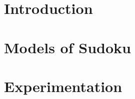 \documentclass[12pt,letterpaper]{article}
\title{\articletitle}
\author{\Us}
\begin{document}
\maketitle

\begin{abstract}
    
\end{abstract}

\section{Introduction}
\label{sec:intro}


\section{Models of Sudoku}
\label{sec:models}


\section{Experimentation}
\label{sec:experimentation}




\end{document}
